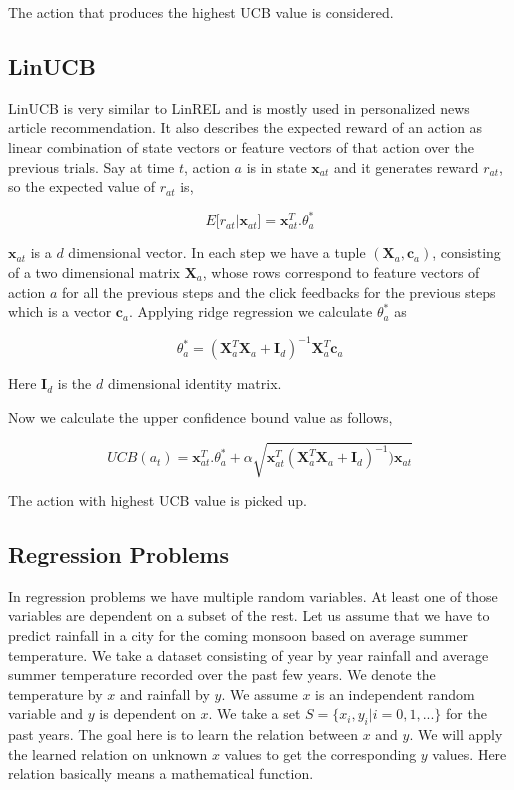 \documentclass[english]{tktltiki}
\begin{document}
The action that produces the highest UCB value is considered.


\subsection{LinUCB}

LinUCB \cite{linucb} is very similar to LinREL and is mostly used in personalized news article recommendation. It also describes the expected reward of an action as linear combination of state vectors or feature vectors of that action over the previous trials. Say at time $t$, action $a$ is in state $\mathbf{x}_{at}$ and it generates reward $r_{at}$, so the expected value of $r_{at}$ is,

\begin{equation}
E\big[r_{at}|\mathbf{x}_{at}\big] = \mathbf{x}_{at}^T . \theta_a^*
\end{equation}

$\mathbf{x}_{at}$ is a $d$ dimensional vector. In each step we have a tuple $(\mathbf{X}_a, \mathbf{c}_a)$, consisting of a two dimensional matrix $\mathbf{X}_a$, whose rows correspond to feature vectors of action $a$ for all the previous steps and the click feedbacks for the previous steps which is a vector $\mathbf{c}_a$. Applying ridge regression we calculate $\theta_a^*$ as

\begin{equation}
\theta_a^* = (\mathbf{X}_a^T \mathbf{X}_a + \mathbf{I}_d)^{-1} \mathbf{X}_a^T \mathbf{c}_a
\end{equation}

Here $\mathbf{I}_d$ is the $d$ dimensional identity matrix.

Now we calculate the upper confidence bound value as follows,

\begin{equation}
UCB(a_t) = \mathbf{x}_{at}^T . \theta_a^* + \alpha \sqrt{\mathbf{x}_{at}^T (\mathbf{X}_a^T \mathbf{X}_a + \mathbf{I}_d)^{-1}) \mathbf{x}_{at}}
\end{equation}

The action with highest UCB value is picked up.

\subsection{Regression Problems}
\label{subsec:reg_prob}

In regression problems we have multiple random variables. At least one of those variables are dependent on a subset of the rest. Let us assume that we have to predict rainfall in a city for the coming monsoon based on average summer temperature. We take a dataset consisting of year by year rainfall and average summer temperature recorded over the past few years. We denote the temperature by $x$ and rainfall by $y$. We assume $x$ is an independent random variable and $y$ is dependent on $x$. We take a set $S = \{x_i, y_i|i = 0, 1, ...\}$ for the past years. The goal here is to learn the relation between $x$ and $y$. We will apply the learned relation on unknown $x$ values to get the corresponding $y$ values. Here relation basically means a mathematical function.
\end{document}

